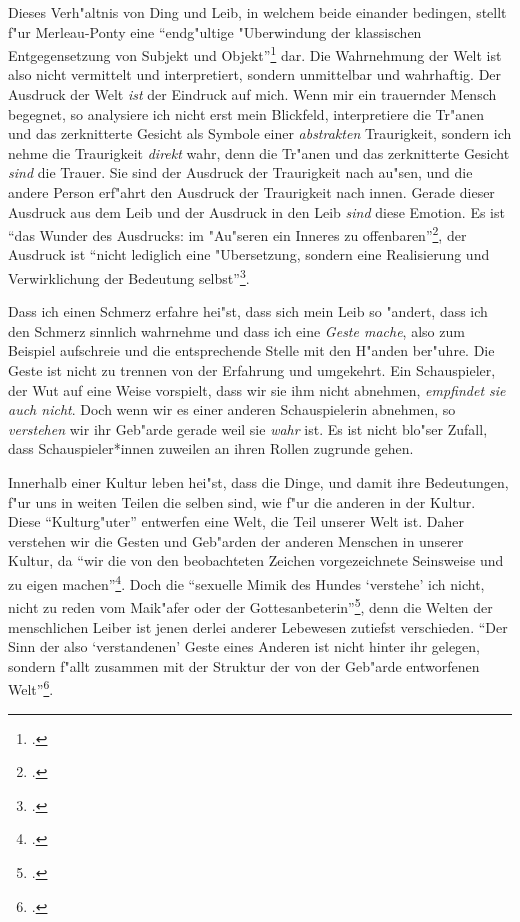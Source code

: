 \documentclass[a4paper, 12pt]{article}
\begin{document}
\begin{onehalfspace}
Dieses Verh"altnis von Ding und Leib, in welchem beide einander bedingen, stellt f"ur Merleau-Ponty eine "`endg"ultige "Uberwindung der klassischen Entgegensetzung von Subjekt und Objekt"'\footnote{\cite[S. 207]{merleau1966phanomenologie}.} dar. Die Wahrnehmung der Welt ist also nicht vermittelt und interpretiert, sondern unmittelbar und wahrhaftig. Der Ausdruck der Welt \emph{ist} der Eindruck auf mich. Wenn mir ein trauernder Mensch begegnet, so analysiere ich nicht erst mein Blickfeld, interpretiere die Tr"anen und das zerknitterte Gesicht als Symbole einer \emph{abstrakten} Traurigkeit, sondern ich nehme die Traurigkeit \emph{direkt} wahr, denn die Tr"anen und das zerknitterte Gesicht \emph{sind} die Trauer. Sie sind der Ausdruck der Traurigkeit nach au"sen, und die andere Person erf"ahrt den Ausdruck der Traurigkeit nach innen. Gerade dieser Ausdruck aus dem Leib und der Ausdruck in den Leib \emph{sind} diese Emotion. Es ist "`das Wunder des Ausdrucks: im "Au"seren ein Inneres zu offenbaren"'\footnote{\cite[S. 370]{merleau1966phanomenologie}.}, der Ausdruck ist "`nicht lediglich eine "Ubersetzung, sondern eine Realisierung und Verwirklichung der Bedeutung selbst"'\footnote{\cite[S. 217]{merleau1966phanomenologie}.}.

Dass ich einen Schmerz erfahre hei"st, dass sich mein Leib so "andert, dass ich den Schmerz sinnlich wahrnehme und dass ich eine \emph{Geste mache}, also zum Beispiel aufschreie und die entsprechende Stelle mit den H"anden ber"uhre. Die Geste ist nicht zu trennen von der Erfahrung und umgekehrt. Ein Schauspieler, der Wut auf eine Weise vorspielt, dass wir sie ihm nicht abnehmen, \emph{empfindet sie auch nicht}. Doch wenn wir es einer anderen Schauspielerin abnehmen, so \emph{verstehen} wir ihr Geb"arde gerade weil sie \emph{wahr} ist. Es ist nicht blo"ser Zufall, dass Schauspieler*innen zuweilen an ihren Rollen zugrunde gehen. 

Innerhalb einer Kultur leben hei"st, dass die Dinge, und damit ihre Bedeutungen, f"ur uns in weiten Teilen die selben sind, wie f"ur die anderen in der Kultur. Diese "`Kulturg"uter"' entwerfen eine Welt, die Teil unserer Welt ist. Daher verstehen wir die Gesten und Geb"arden der anderen Menschen in unserer Kultur, da "`wir die von den beobachteten Zeichen vorgezeichnete Seinsweise und zu eigen machen"'\footnote{\cite[S. 370]{merleau1966phanomenologie}.}. Doch die "`sexuelle Mimik des Hundes `verstehe' ich nicht, nicht zu reden vom Maik"afer oder der Gottesanbeterin"'\footnote{\cite[S. 219]{merleau1966phanomenologie}.}, denn die Welten der menschlichen Leiber ist jenen derlei anderer Lebewesen zutiefst verschieden. "`Der Sinn der also `verstandenen' Geste eines Anderen ist nicht hinter ihr gelegen, sondern f"allt zusammen mit der Struktur der von der Geb"arde entworfenen Welt"'\footnote{\cite[S. 220]{merleau1966phanomenologie}.}.



\end{onehalfspace}
\end{document}
